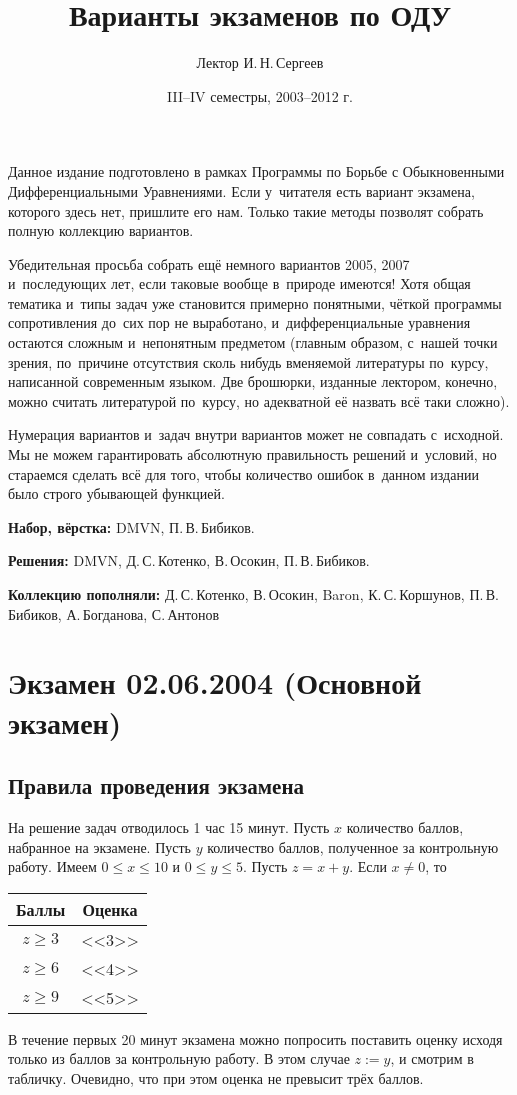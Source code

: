 \documentclass{article}
\title{Варианты экзаменов по ОДУ}
\author{Лектор И.\,Н.\,Сергеев}
\date{III--IV семестры, 2003--2012 г.}
\begin{document}
\maketitle
{\footnotesize Данное издание подготовлено в рамках Программы по Борьбе с Обыкновенными Дифференциальными
Уравнениями. Если у~читателя есть вариант экзамена, которого здесь нет, пришлите
его нам. Только такие методы позволят собрать полную коллекцию
вариантов.

Убедительная просьба собрать ещё немного вариантов 2005, 2007
и~последующих лет, если таковые вообще в~природе имеются!  Хотя общая
тематика и~типы задач уже становится примерно понятными, чёткой
программы сопротивления до~сих пор не выработано, и~дифференциальные
уравнения остаются сложным и~непонятным предметом (главным образом,
с~нашей точки зрения, по~причине отсутствия сколь нибудь вменяемой
литературы по~курсу, написанной современным языком. Две брошюрки,
изданные лектором, конечно, можно считать литературой по~курсу, но
адекватной её назвать всё таки сложно).

Нумерация вариантов и~задач внутри вариантов может не совпадать с~исходной. Мы не можем гарантировать абсолютную
правильность решений и~условий, но стараемся сделать всё для того, чтобы количество ошибок в~данном издании было
строго убывающей функцией.

\textbf{Набор, вёрстка:} DMVN, П.\,В.\,Бибиков.

\textbf{Решения:} DMVN, Д.\,С.\,Котенко, В.\,Осокин, П.\,В.\,Бибиков.

\textbf{Коллекцию пополняли:} Д.\,С.\,Котенко, В.\,Осокин, Baron, К.\,С.\,Коршунов, П.\,В.\,Бибиков,
А.\,Богданова, С.\,Антонов\par}
\medskip\dmvntrail

\section{Экзамен 02.06.2004 (Основной экзамен)}

\subsection*{Правила проведения экзамена}

На решение задач отводилось 1 час 15 минут.
Пусть $x$ количество баллов, набранное на экзамене. Пусть $y$ количество баллов,
полученное за контрольную работу. Имеем $0\le x \le 10$ и $0 \le y \le 5$.
Пусть $z = x+ y$. Если $x \neq 0$, то
\begin{center}
\begin{tabular}{|c|c|}
\hline Баллы    & Оценка \\
\hline $z \ge 3$ & <<3>> \\
\hline $z \ge 6$ & <<4>> \\
\hline $z \ge 9$ & <<5>> \\
\hline
\end{tabular}
\end{center}
В течение первых 20 минут экзамена можно попросить поставить оценку
исходя только из баллов за контрольную работу. В этом случае $z := y$, и смотрим в табличку.
Очевидно, что при этом оценка не превысит трёх баллов.
\end{document}

